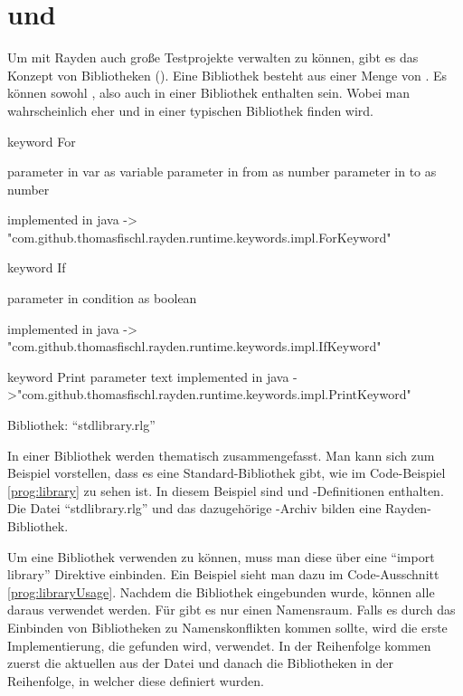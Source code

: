 \section{ und }

Um mit Rayden auch große Testprojekte verwalten zu können, gibt es das Konzept von Bibliotheken (). Eine Bibliothek besteht aus einer Menge von . Es können sowohl ,  also auch  in einer Bibliothek enthalten sein. Wobei man wahrscheinlich eher  und  in einer typischen Bibliothek finden wird.  

\begin{program}
\begin{JavaCode}
keyword For { 
	parameter in var as variable
	parameter in from as number
	parameter in to as number

	implemented in java -> "com.github.thomasfischl.rayden.runtime.keywords.impl.ForKeyword"
}

keyword If { 
	parameter in condition as boolean

	implemented in java -> "com.github.thomasfischl.rayden.runtime.keywords.impl.IfKeyword"
}

keyword Print {
	parameter text
	implemented in java ->"com.github.thomasfischl.rayden.runtime.keywords.impl.PrintKeyword"
}
\end{JavaCode}
\caption{Bibliothek: "`stdlibrary.rlg"'}
\label{prog:library}
\end{program}

\SuperPar
In einer Bibliothek werden  thematisch zusammengefasst. Man kann sich zum Beispiel vorstellen, dass es eine Standard-Bibliothek gibt, wie im Code-Beispiel \ref{prog:library} zu sehen ist. In diesem Beispiel sind  und -Definitionen enthalten. Die Datei "`stdlibrary.rlg"' und das dazugehörige -Archiv bilden eine Rayden-Bibliothek. 

\SuperPar
Um eine Bibliothek verwenden zu können, muss man diese über eine "`import library"' Direktive einbinden. Ein Beispiel sieht man dazu im Code-Ausschnitt \ref{prog:libraryUsage}. Nachdem die Bibliothek eingebunden wurde, können alle  daraus verwendet werden. Für  gibt es nur einen Namensraum. Falls es durch das Einbinden von Bibliotheken zu Namenskonflikten kommen sollte, wird die erste Implementierung, die gefunden wird, verwendet. In der Reihenfolge kommen zuerst die aktuellen  aus der Datei und danach die Bibliotheken in der Reihenfolge, in welcher diese definiert wurden.

